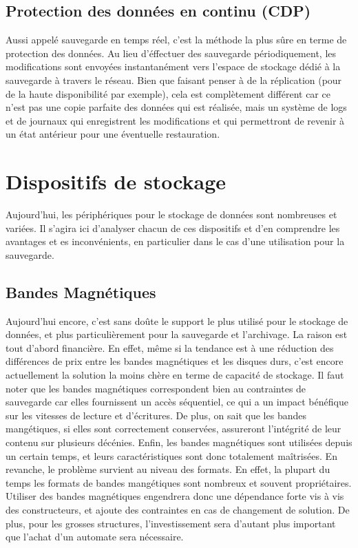 \documentclass[a4paper,11pt]{report}
\begin{document}
\subsection{Protection des données en continu (CDP)}
Aussi appelé sauvegarde en temps réel, c'est la méthode la plus sûre en terme de protection des données.
Au lieu d'éffectuer des sauvegarde périodiquement, les modifications sont envoyées instantanément vers l'espace de stockage dédié à la sauvegarde à travers le réseau.
Bien que faisant penser à de la réplication (pour de la haute disponibilité par exemple), cela est complètement différent car ce n'est pas une copie parfaite des données qui est réalisée, mais un système de logs et de journaux qui enregistrent les modifications et qui permettront de revenir à un état antérieur pour une éventuelle restauration.


\section{Dispositifs de stockage}
Aujourd'hui, les périphériques pour le stockage de données sont nombreuses et variées. Il s'agira ici d'analyser chacun de ces dispositifs et d'en comprendre les avantages et es inconvénients, en particulier dans le cas d'une utilisation pour la sauvegarde.

\subsection{Bandes Magnétiques}
Aujourd'hui encore, c'est sans doûte le support le plus utilisé pour le stockage de données, et plus particulièrement pour la sauvegarde et l'archivage.
La raison est tout d'abord financière. En effet, même si la tendance est à une réduction des différences de prix entre les bandes magnétiques et les disques durs, c'est encore actuellement la solution la moins chère en terme de capacité de stockage.
Il faut noter que les bandes magnétiques correspondent bien au contraintes de sauvegarde car elles fournissent un accès séquentiel, ce qui a un impact bénéfique sur les vitesses de lecture et d'écritures.
De plus, on sait que les bandes mangétiques, si elles sont correctement conservées, assureront l'intégrité de leur contenu sur plusieurs décénies.
Enfin, les bandes magnétiques sont utilisées depuis un certain temps, et leurs caractéristiques sont donc totalement maîtrisées.
En revanche, le problème survient au niveau des formats. En effet, la plupart du temps les formats de bandes mangétiques sont nombreux et souvent propriétaires. Utiliser des bandes magnétiques engendrera donc une dépendance forte vis à vis des constructeurs, et ajoute des contraintes en cas de changement de solution.
De plus, pour les grosses structures, l'investissement sera d'autant plus important que l'achat d'un automate sera nécessaire.
\end{document}
